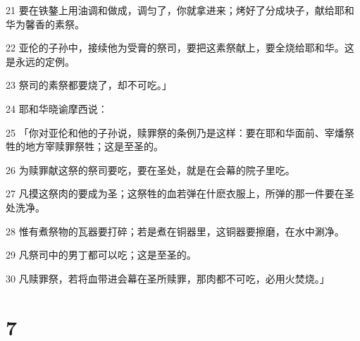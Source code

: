 \par 21 要在铁鏊上用油调和做成，调匀了，你就拿进来；烤好了分成块子，献给耶和华为馨香的素祭。
\par 22 亚伦的子孙中，接续他为受膏的祭司，要把这素祭献上，要全烧给耶和华。这是永远的定例。
\par 23 祭司的素祭都要烧了，却不可吃。」
\par 24 耶和华晓谕摩西说：
\par 25 「你对亚伦和他的子孙说，赎罪祭的条例乃是这样：要在耶和华面前、宰燔祭牲的地方宰赎罪祭牲；这是至圣的。
\par 26 为赎罪献这祭的祭司要吃，要在圣处，就是在会幕的院子里吃。
\par 27 凡摸这祭肉的要成为圣；这祭牲的血若弹在什麽衣服上，所弹的那一件要在圣处洗净。
\par 28 惟有煮祭物的瓦器要打碎；若是煮在铜器里，这铜器要擦磨，在水中涮净。
\par 29 凡祭司中的男丁都可以吃；这是至圣的。
\par 30 凡赎罪祭，若将血带进会幕在圣所赎罪，那肉都不可吃，必用火焚烧。」

\chapter{7}

